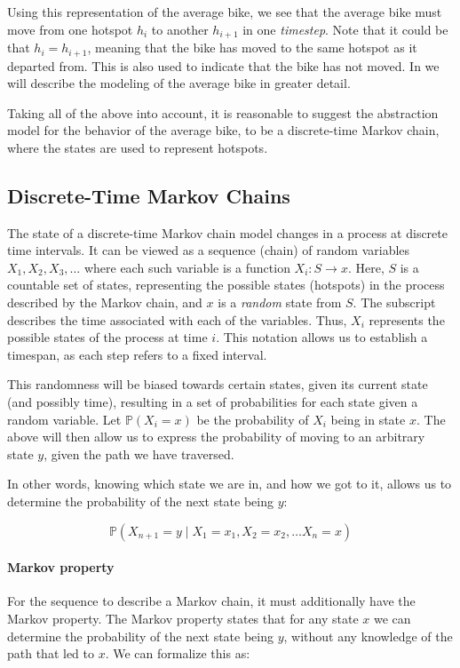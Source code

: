 Using this representation of the average bike, we see that the average bike must move from one hotspot $h_i$ to another $h_{i+1}$ in one \emph{timestep}.
Note that it could be that $h_i = h_{i+1}$, meaning that the bike has moved to the same hotspot as it departed from.
This is also used to indicate that the bike has not moved.
In  we will describe the modeling of the average bike in greater detail.

Taking all of the above into account, it is reasonable to suggest the abstraction model for the behavior of the average bike, to be a discrete-time Markov chain, where the states are used to represent hotspots.

\subsection{Discrete-Time Markov Chains}\label{markov}
The state of a discrete-time Markov chain model changes in a process at discrete time intervals.
It can be viewed as a sequence (chain) of random variables $X_1, X_2, X_3, \dots$ where each such variable is a function $X_i:S \rightarrow x$.
Here, $S$ is a countable set of states, representing the possible states (hotspots) in the process described by the Markov chain, and $x$ is a \textit{random} state from $S$.
The subscript describes the time associated with each of the variables.
Thus, $X_i$ represents the possible states of the process at time $i$.
This notation allows us to establish a timespan, as each step refers to a fixed interval.

This randomness will be biased towards certain states, given its current state (and possibly time), resulting in a set of probabilities for each state given a random variable.
Let $\mathbb{P}(X_i = x)$ be the probability of $X_i$ being in state $x$.
The above will then allow us to express the probability of moving to an arbitrary state $y$, given the path we have traversed.

In other words, knowing which state we are in, and how we got to it, allows us to determine the probability of the next state being $y$:

$$\mathbb{P}(X_{n+1} = y \mid X_1 = x_1, X_2 = x_2, \dots X_n = x)$$

\paragraph{Markov property}\label{markov:property}
For the sequence to describe a Markov chain, it must additionally have the Markov property.
The Markov property states that for any state $x$ we can determine the probability of the next state being $y$, without any knowledge of the path that led to $x$.
We can formalize this as:

